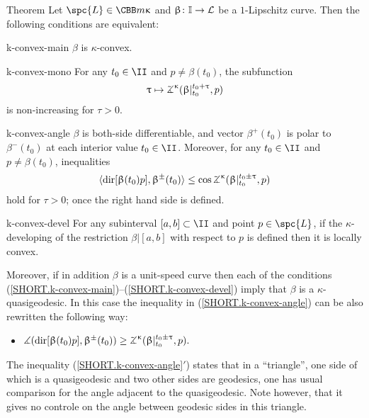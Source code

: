 \begin{thm}{Theorem}\label{thm:defs.of.k-convex.curve}
Let $\spc{L}\in \CBB m \kappa$ 
and
$\beta\:\II\to \spc{L}$ be a $1$-Lipschitz curve.
Then the following conditions are equivalent:

\begin{subthm}{k-convex-main} $\beta$ is $\kappa$-convex. 
\end{subthm}


\begin{subthm}{k-convex-mono} For any $t_0\in\II$ and $p\not=\beta(t_0)$, 
the subfunction
\[\tau \mapsto\tangle\mc\kappa(\beta|_{t_0}^{t_0+\tau},p)\]
is non-increasing for $\tau>0$.
\end{subthm}

\begin{subthm}{k-convex-angle} $\beta$ is both-side differentiable, and vector $\beta^+(t_0)$ is polar to $\beta^-(t_0)$ at each interior value $t_0\in \II$.
Moreover, for any $t_0\in\II$ and $p\not=\beta(t_0)$, inequalities
\[\<\dir{\beta(t_0)}p,\beta^\pm(t_0)\>
\le 
\cos\tangle\mc\kappa(\beta|_{t_0}^{t_0\pm\tau}, p)\] 
hold for $\tau>0$; once the right hand side is defined.
\end{subthm}

\begin{subthm}{k-convex-devel} For any subinterval $[a,b]\subset\II$ and point $p\in \spc{L}$,
if the $\kappa$-developing of the restriction $\beta|[a,b]$
with respect to $p$ is defined then it is locally convex.
\end{subthm}

Moreover, if in addition $\beta$ is a unit-speed curve then each of the conditions  (\ref{SHORT.k-convex-main})--(\ref{SHORT.k-convex-devel}) imply that $\beta$ is a $\kappa$-quasigeodesic.
In this case the inequality in (\ref{SHORT.k-convex-angle}) can be also rewritten the following way:
\begin{itemize}
 \item[\textit{\ref{SHORT.k-convex-angle}$'$)}] $\mangle(\dir{\beta(t_0)}p,\beta^\pm(t_0))
\ge \tangle\mc\kappa(\beta|_{t_0}^{t_0\pm\tau}, p).$
\end{itemize}



\end{thm}

The inequality (\ref{SHORT.k-convex-angle}$'$) states that in a ``triangle'', one side of which is a quasigeodesic and two other sides are geodesics, one has usual comparison for the angle adjacent to the quasigeodesic.
Note however, that it gives no controle on the angle between geodesic sides in this triangle.

